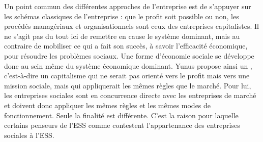             Un point commun des différentes approches de l’entreprise est de s’appuyer sur les schémas classiques de l’entreprise : que le profit soit possible ou non, les procédés managériaux et organisationnels sont ceux des entreprises capitalistes. Il ne s’agit pas du tout ici de remettre en cause le système dominant, mais au contraire de mobiliser ce qui a fait son succès, à savoir l’efficacité économique, pour résoudre les problèmes sociaux. Une forme d’économie sociale se développe donc au sein même du système économique dominant. Yunus propose ainsi un , c'est-à-dire un capitalisme qui ne serait pas orienté vers le profit mais vers une mission sociale, mais qui appliquerait les mêmes règles que le marché. Pour lui, les entreprises sociales sont en concurrence directe avec les entreprises de marché et doivent donc appliquer les mêmes règles et les mêmes modes de fonctionnement. Seule la finalité est différente. C’est la raison pour laquelle certains penseurs de l’ESS comme \textcite{draperi2015leconomie} contestent l’appartenance des entreprises sociales à l’ESS. \\

